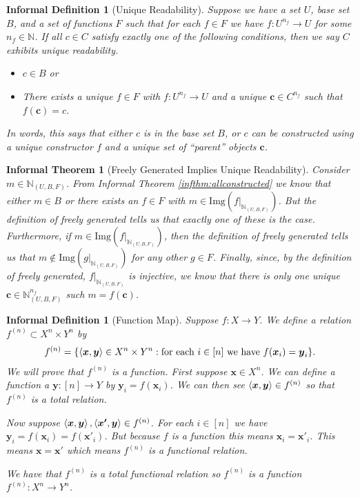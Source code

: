 \documentclass[12pt]{article}
\theoremstyle{break}
\theoremstyle{break}
\theoremstyle{break}
\theoremstyle{break}
\theoremstyle{break}
\newtheorem{informal definition}[definition]{Informal Definition}
\theoremstyle{break}
\newtheorem{informal theorem}[theorem]{Informal Theorem}
\newcommand{\bv}[1]{\boldsymbol{#1}}
\newcommand{\natnum}[0]{\mathbb{N}}
\begin{document}
	\begin{informal definition}[Unique Readability]
		Suppose we have a set $U$, base set $B$, and a set of functions $F$ such that for each $f\in F$ we have $f:U^{n_f} \to U$ for some $n_f\in \natnum$. 
		If all $c\in C$ satisfy exactly one of the following conditions, then we say $C$ exhibits unique readability.
		\begin{itemize}
			\item{$c\in B$ or}
			\item{There exists a unique $f\in F$ with $f:U^{n_f}\to U$ and a unique $\bv{c}\in C^{n_f}$ such that $f(\bv{c}) = c$.}
		\end{itemize}
		In words, this says that either $c$ is in the base set $B$, or $c$ can be constructed using a unique constructor $f$ and a unique set of ``parent'' objects $\bv{c}$.
	\end{informal definition}
	
	\begin{informal theorem}[Freely Generated Implies Unique Readability]
		Consider $m\in \natnum_{(U, B, F)}$.
		From Informal Theorem \ref{infthm:allconstructed} we know that either $m\in B$ or there exists an $f\in F$ with $m\in \text{Img}(f|_{\natnum_{(U, B, F)}})$.
		But the definition of freely generated tells us that exactly one of these is the case. 
		Furthermore, if $m\in \text{Img}(f|_{\natnum_{(U, B, F)}})$, then the definition of freely generated tells us that $m\not \in\text{Img}(g|_{\natnum_{(U, B, F)}})$ for any other $g\in F$.
		Finally, since, by the definition of freely generated, $f|_{\natnum_{(U, B, F)}}$ is injective, we know that there is only one unique $\bv{c}\in \natnum_{(U, B, F)}^{n_f}$ such $m = f(\bv{c})$.
	\end{informal theorem}
	
	\begin{informal definition}[Function Map]
		Suppose $f: X\to Y$.
		We define a relation $f^{(n)}\subset X^n \times Y^n$ by
		\begin{align*}
			f^{(n)} = \{\braket{\bv{x}, \bv{y}} \in X^n\times Y^n: \text{for each } i\in [n] \text{ we have } f(\bv{x}_i) = \bv{y}_i\}.
		\end{align*}
		We will prove that $f^{(n)}$ is a function.
		First suppose $\bv{x}\in X^n$. 
		We can define a function a $\bv{y}:[n] \to Y$ by $\bv{y}_i = f(\bv{x}_i)$.
		We can then see $\braket{\bv{x}, \bv{y}} \in f^{(n)}$ so that $f^{(n)}$ is a total relation.
		
		Now suppose $\braket{\bv{x}, \bv{y}}, \braket{\bv{x'}, \bv{y}} \in f^{(n)}$.
		For each $i\in [n]$ we have $\bv{y}_i = f(\bv{x}_i) = f(\bv{x}'_i)$.
		But because $f$ is a function this means $\bv{x}_i = \bv{x}'_i$. This means $\bv{x} = \bv{x}'$ which means $f^{(n)}$ is a functional relation.
		
		We have that $f^{(n)}$ is a total functional relation so $f^{(n)}$ is a function $f^{(n)}:X^n \to Y^n$.
		
	\end{informal definition}
		
\end{document}
